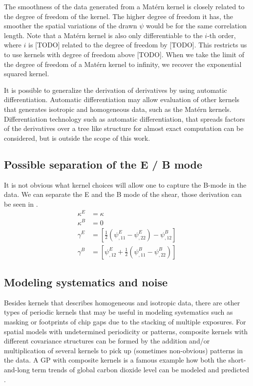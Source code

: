The smoothness of the data generated from a Mat\'{e}rn kernel is closely
related to the degree of freedom of the kernel. 
The higher degree of freedom it has, the smoother the spatial variations of the
drawn $\psi$ would be for the same correlation length.
Note that a Mat\'{e}rn kernel is also only differentiable to the $i$-th order,
where $i$ is [TODO] related to the degree of freedom by [TODO].
This restricts us to use kernels with degree of freedom above [TODO]. 
When we take the limit of the degree of freedom of a Mat\'{e}rn kernel to infinity, 
we recover the exponential squared kernel.

It is possible to generalize the derivation of derivatives by using automatic
differentiation. Automatic differentiation may allow evaluation of other
kernels that generates isotropic and homogeneous data, 
such as the Mat\'{e}rn kernels.  
Differentiation technology such as automatic differentiation, 
that spreads factors of the derivatives over a tree like structure for
almost exact computation can be considered, but is outside the scope of this work.



\subsection{Possible separation of the E / B mode}


It is not obvious what kernel choices will allow one to capture the B-mode 
in the data.
We can separate the E and the B mode of the shear, those derivation can be seen in  
\cite{Schneider2001a}.
 \begin{align}
	\kappa^E & = \kappa\\
	\kappa^B & = 0 \\
	\gamma^E &= \left[\frac{1}{2} (\psi^E_{,11} - \psi^E_{,22}) -
	\psi^B_{,12}\right]\\
	\gamma^B &= \left[\psi^E_{,12} + \frac{1}{2} (\psi^B_{,11} - \psi^B_{,22})\right]
\end{align}


\subsection{Modeling systematics and noise}
Besides kernels that describes homogeneous and isotropic data,
there are other types of periodic kernels that may be useful
in modeling systematics such as masking or footprints of chip gaps due to the
stacking of multiple exposures.
For spatial models with undetermined periodicity or patterns, 
composite kernels with different covariance structures 
can be formed by the addition and/or multiplication of several kernels
 to pick up (sometimes non-obvious) patterns in the data. 
A GP with composite kernels is a
famous example how both the short-and-long term trends of global carbon
dioxide level can be modeled and predicted \citep{Duvenaud2013}.



